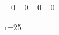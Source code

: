 \chardef{}   =0
\chardef{}   =0
\chardef{}   =0
\chardef{}   =0
\def\ogonek #1{\setbox0\hbox{#1}\ifdim\ht0=1ex\accent12 #1%
   \else{\ooalign{\unhbox0\crcr\hss\char12}}\fi}
\def\promile{\char37 \char24 }
\let\extrahyphenchar=\undefined
\let\extrahyphens=\undefined
\def\uv{\bgroup\aftergroup\closequotes\leavevmode
        \afterassignment\clqq\let\next=}
\def\closequotes{\unskip\crqq\relax}

\chardef\i=25

\endinput


